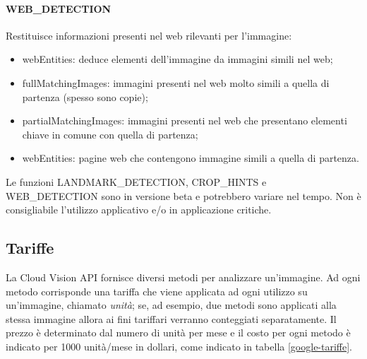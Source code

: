 \paragraph{\textsf{WEB\_DETECTION}} Restituisce informazioni presenti nel web rilevanti per l'immagine:
\begin{itemize}
\item \textsf{webEntities}: deduce elementi dell'immagine da immagini simili nel web;
\item \textsf{fullMatchingImages}: immagini presenti nel web molto simili a quella di partenza (spesso sono copie); 
\item \textsf{partialMatchingImages}: immagini presenti nel web che presentano elementi chiave in comune con quella di partenza;
\item \textsf{webEntities}: pagine web che contengono immagine simili a quella di partenza.
\end{itemize}

%

Le funzioni \textsf{LANDMARK\_DETECTION}, \textsf{CROP\_HINTS} e \textsf{WEB\_DETECTION} sono in versione beta e potrebbero variare nel tempo.
Non è consigliabile l'utilizzo applicativo e/o in applicazione critiche. 
%
%
%
\subsection{Tariffe}
La Cloud Vision API fornisce diversi metodi per analizzare un'immagine.
Ad ogni metodo corrisponde una tariffa che viene applicata ad ogni utilizzo su un'immagine, chiamato \textit{unità};
se, ad esempio, due metodi sono applicati alla stessa immagine allora ai fini tariffari verranno conteggiati separatamente.
Il prezzo è determinato dal numero di unità per mese e il costo per ogni metodo è indicato per 1000 unità/mese in dollari, come indicato in tabella \ref{google-tariffe}.

